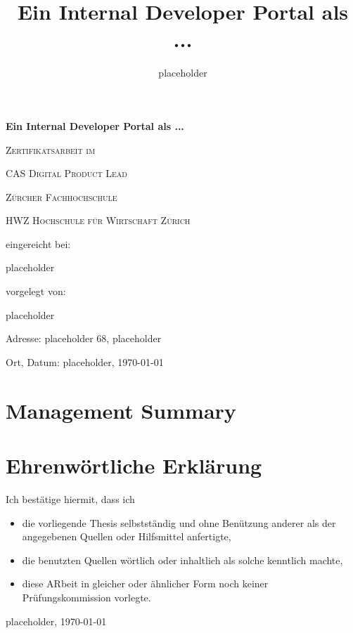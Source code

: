 \documentclass[a4paper,12pt]{article}
\title{Ein Internal Developer Portal als ... }
\author{placeholder}
\begin{document}
    \begin{titlepage}
        \begin{center}
        {\huge\bfseries Ein Internal Developer Portal als ...\par}
            \vspace{2cm}

            {\scshape\large Zertifikatsarbeit im \par}
            {\scshape\large CAS Digital Product Lead \par}
            \vspace{1cm}

            {\scshape\large Zürcher Fachhochschule \par}
            {\scshape\large HWZ Hochschule für Wirtschaft Zürich \par}
            \vspace{4cm}

            {\normalsize eingereicht bei:\par}
            \vspace{0.5cm}

            {\large placeholder\par}
            \vfill
            {\normalsize vorgelegt von:\par}
            \vspace{0.5cm}
            {\large placeholder\par}
            \vspace{0.5cm}
            {\normalsize Adresse: placeholder 68, placeholder\par}
            {\normalsize  Ort, Datum: placeholder, \today\par}

        \end{center}
    \end{titlepage}


    \section{Management Summary}
    \pagebreak


    \tableofcontents
    \pagebreak


    \section{Ehrenwörtliche Erklärung}

    Ich bestätige hiermit, dass ich
    \begin{itemize}
        \item die vorliegende Thesis selbstständig und ohne Benützung anderer als der angegebenen Quellen oder Hilfsmittel anfertigte,
        \item die benutzten Quellen wörtlich oder inhaltlich als solche kenntlich machte,
        \item diese ARbeit in gleicher oder ähnlicher Form noch keiner Prüfungskommission vorlegte.
    \end{itemize}
    placeholder, \today\newline
    \dashsign
\end{document}
